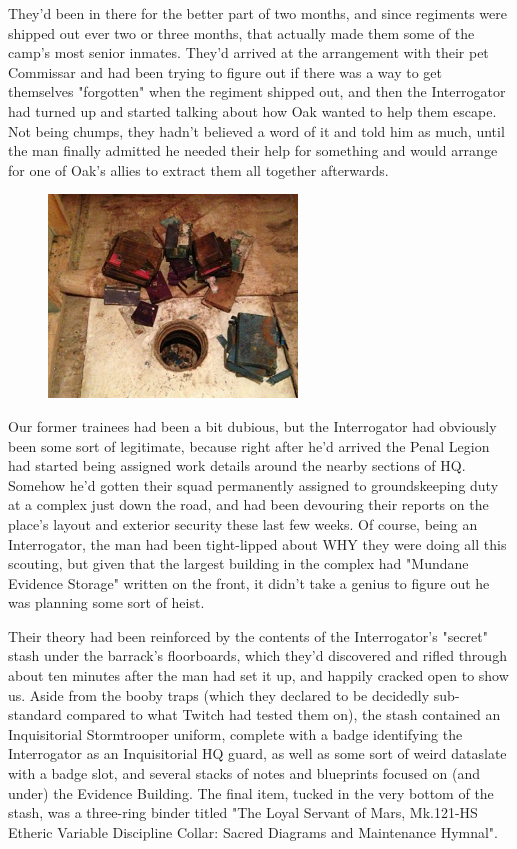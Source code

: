 They'd been in there for the better part of two months, and since regiments were shipped out ever two or three months, that actually made them some of the camp's most senior inmates. 
They'd arrived at the arrangement with their pet Commissar and had been trying to figure out if there was a way to get themselves "forgotten" when the regiment shipped out, and then the Interrogator had turned up and started talking about how Oak wanted to help them escape. 
Not being chumps, they hadn't believed a word of it and told him as much, until the man finally admitted he needed their help for something and would arrange for one of Oak's allies to extract them all together afterwards.

\begin{figure}
	\begin{center}
		\includegraphics[width=\figwidth]{pics/21/14.png}
	\end{center}
\end{figure}
Our former trainees had been a bit dubious, but the Interrogator had obviously been some sort of legitimate, because right after he'd arrived the Penal Legion had started being assigned work details around the nearby sections of HQ. 
Somehow he'd gotten their squad permanently assigned to groundskeeping duty at a complex just down the road, and had been devouring their reports on the place's layout and exterior security these last few weeks. 
Of course, being an Interrogator, the man had been tight-lipped about WHY they were doing all this scouting, but given that the largest building in the complex had "Mundane Evidence Storage" written on the front, it didn't take a genius to figure out he was planning some sort of heist. 


Their theory had been reinforced by the contents of the Interrogator's "secret" stash under the barrack's floorboards, which they'd discovered and rifled through about ten minutes after the man had set it up, and happily cracked open to show us. 
Aside from the booby traps (which they declared to be decidedly sub-standard compared to what Twitch had tested them on), the stash contained an Inquisitorial Stormtrooper uniform, complete with a badge identifying the Interrogator as an Inquisitorial HQ guard, as well as some sort of weird dataslate with a badge slot, and several stacks of notes and blueprints focused on (and under) the Evidence Building. 
The final item, tucked in the very bottom of the stash, was a three-ring binder titled "The Loyal Servant of Mars, Mk.121-HS Etheric Variable Discipline Collar: 
Sacred Diagrams and Maintenance Hymnal". 


